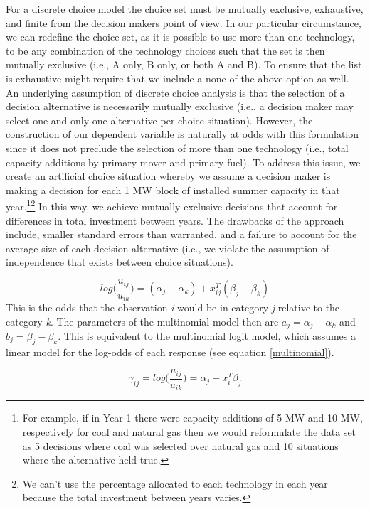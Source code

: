\documentclass[10pt]{amsart}
\begin{document}
For a discrete choice model the choice set must be mutually exclusive, exhaustive, and finite from the decision makers point of view. In our particular circumstance, we can redefine the choice set, as it is possible to use more than one technology, to be any combination of the technology choices such that the set is then mutually exclusive (i.e., A only, B only, or both A and B). To ensure that the list is exhaustive might require that we include a none of the above option as well.
An underlying assumption of discrete choice analysis is that the selection of a decision alternative is necessarily mutually exclusive (i.e., a decision maker may select one and only one alternative per choice situation). 
However, the construction of our dependent variable is naturally at odds with this formulation since it does not preclude the selection of more than one technology (i.e., total capacity additions by primary mover and primary fuel).
To address this issue, we create an artificial choice situation whereby we assume a decision maker is making a decision for each 1 MW block of installed summer capacity in that year.\footnote{For example, if in Year 1 there were capacity additions of 5 MW and 10 MW, respectively for coal and natural gas then we would reformulate the data set as 5 decisions where coal was selected over natural gas and 10 situations where the alternative held true.}\footnote{We can't use the percentage allocated to each technology in each year because the total investment between years varies.} 
In this way, we achieve mutually exclusive decisions that account for differences in total investment between years.
The drawbacks of the approach include, smaller standard errors than warranted, and a failure to account for the average size of each decision alternative (i.e., we violate the assumption of independence that exists between choice situations).

\begin{equation}\label{log_odds}
log\Big(\frac{u_{ij}}{u_{ik}}\Big) = (\alpha_j-\alpha_k) + x_{ij}^T(\beta_j - \beta_k)
\end{equation}
This is the odds that the observation \textit{i} would be in category \textit{j} relative to the category \textit{k}.
The parameters of the multinomial model then are $a_j = \alpha_j - \alpha_k$ and $b_j = \beta_j -\beta_k$. 
This is equivalent to the multinomial logit model, which assumes a linear model for the log-odds of each response (see equation \ref{multinomial}). 

\begin{equation}\label{multinomial}
\gamma_{ij} = log\Big(\frac{u_{ij}}{u_{ik}}\Big) = \alpha_j + x_i^T\beta_j
\end{equation}
\end{document}
